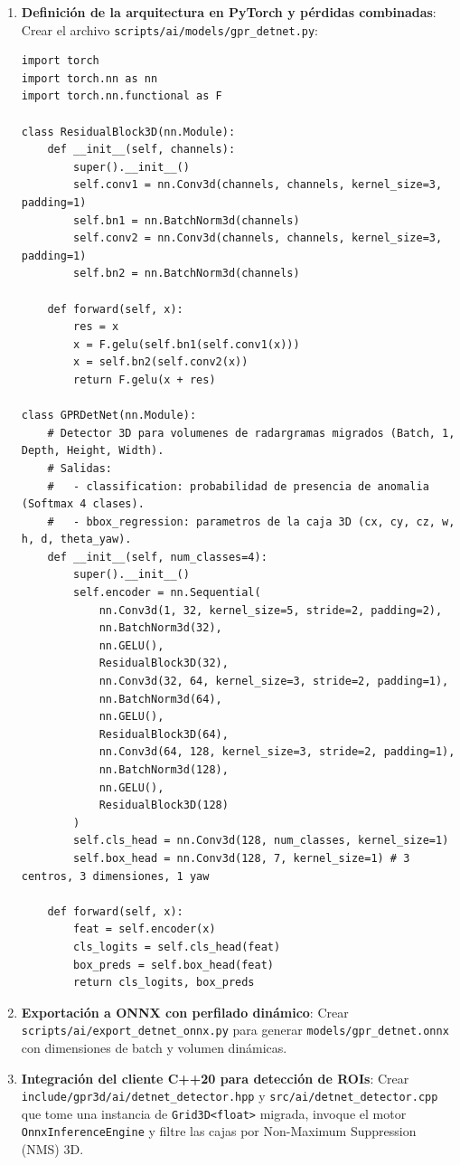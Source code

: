 \documentclass[11pt,a4paper]{article}
\begin{document}
\begin{enumerate}
    \item \textbf{Definici{\'o}n de la arquitectura en PyTorch y p{\'e}rdidas combinadas}:
    Crear el archivo \texttt{scripts/ai/models/gpr\_detnet.py}:
\begin{verbatim}
import torch
import torch.nn as nn
import torch.nn.functional as F

class ResidualBlock3D(nn.Module):
    def __init__(self, channels):
        super().__init__()
        self.conv1 = nn.Conv3d(channels, channels, kernel_size=3, padding=1)
        self.bn1 = nn.BatchNorm3d(channels)
        self.conv2 = nn.Conv3d(channels, channels, kernel_size=3, padding=1)
        self.bn2 = nn.BatchNorm3d(channels)

    def forward(self, x):
        res = x
        x = F.gelu(self.bn1(self.conv1(x)))
        x = self.bn2(self.conv2(x))
        return F.gelu(x + res)

class GPRDetNet(nn.Module):
    # Detector 3D para volumenes de radargramas migrados (Batch, 1, Depth, Height, Width).
    # Salidas:
    #   - classification: probabilidad de presencia de anomalia (Softmax 4 clases).
    #   - bbox_regression: parametros de la caja 3D (cx, cy, cz, w, h, d, theta_yaw).
    def __init__(self, num_classes=4):
        super().__init__()
        self.encoder = nn.Sequential(
            nn.Conv3d(1, 32, kernel_size=5, stride=2, padding=2),
            nn.BatchNorm3d(32),
            nn.GELU(),
            ResidualBlock3D(32),
            nn.Conv3d(32, 64, kernel_size=3, stride=2, padding=1),
            nn.BatchNorm3d(64),
            nn.GELU(),
            ResidualBlock3D(64),
            nn.Conv3d(64, 128, kernel_size=3, stride=2, padding=1),
            nn.BatchNorm3d(128),
            nn.GELU(),
            ResidualBlock3D(128)
        )
        self.cls_head = nn.Conv3d(128, num_classes, kernel_size=1)
        self.box_head = nn.Conv3d(128, 7, kernel_size=1) # 3 centros, 3 dimensiones, 1 yaw

    def forward(self, x):
        feat = self.encoder(x)
        cls_logits = self.cls_head(feat)
        box_preds = self.box_head(feat)
        return cls_logits, box_preds
\end{verbatim}

    \item \textbf{Exportaci{\'o}n a ONNX con perfilado din{\'a}mico}:
    Crear \texttt{scripts/ai/export\_detnet\_onnx.py} para generar \texttt{models/gpr\_detnet.onnx} con dimensiones de batch y volumen din{\'a}micas.

    \item \textbf{Integraci{\'o}n del cliente C++20 para detecci{\'o}n de ROIs}:
    Crear \texttt{include/gpr3d/ai/detnet\_detector.hpp} y \texttt{src/ai/detnet\_detector.cpp} que tome una instancia de \texttt{Grid3D<float>} migrada, invoque el motor \texttt{OnnxInferenceEngine} y filtre las cajas por Non-Maximum Suppression (NMS) 3D.
\end{enumerate}
\end{document}
